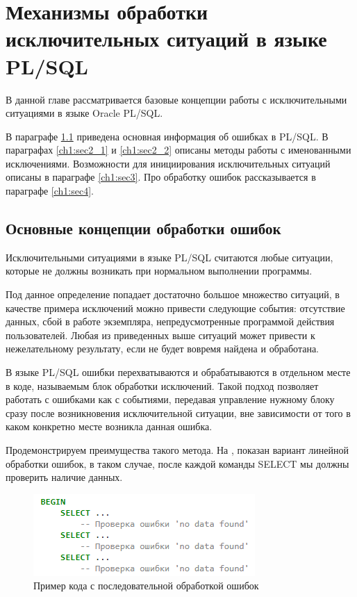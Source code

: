 \chapter{Механизмы обработки исключительных ситуаций в языке PL/SQL} \label{ch1}

В данной главе рассматривается базовые концепции работы с исключительными ситуациями в языке Oracle PL/SQL.

В параграфе \ref{ch1:sec1} приведена основная информация об ошибках в PL/SQL. В параграфах \ref{ch1:sec2_1} и \ref{ch1:sec2_2} описаны методы работы с именованными исключениями. Возможности для инициирования исключительных ситуаций описаны в параграфе \ref{ch1:sec3}. Про обработку ошибок рассказывается в параграфе \ref{ch1:sec4}.


\section{Основные концепции обработки ошибок} \label{ch1:sec1}

Исключительными ситуациями в языке PL/SQL считаются любые ситуации, которые не должны возникать при нормальном выполнении программы\cite[с.~132]{ferstein}. 

Под данное определение попадает достаточно большое множество ситуаций, в качестве примера исключений можно привести следующие события: отсутствие данных, сбой в работе экземпляра, непредусмотренные программой действия пользователей. Любая из приведенных выше ситуаций может привести к нежелательному результату, если не будет вовремя найдена и обработана.
 
В языке PL/SQL ошибки перехватываются и обрабатываются в отдельном месте в коде, называемым блок обработки исключений. Такой подход позволяет работать с ошибками как с событиями, передавая управление нужному блоку сразу после возникновения исключительной ситуации, вне зависимости от того в каком конкретно месте возникла данная ошибка. 

Продемонстрируем преимущества такого метода. 
На , показан вариант линейной обработки ошибок, в таком случае, после каждой команды SELECT мы должны проверить наличие данных.

\begin{figure}[ht!] 
	\center
	\includegraphics [scale=1] {my_folder/img/C1_code1.png}
	\caption{Пример кода с последовательной обработкой ошибок} 
	\label{fig:c1_code1}  
\end{figure}
\FloatBarrier

